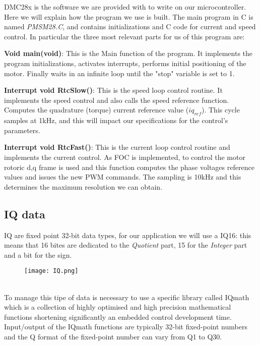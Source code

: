 \documentclass[12pt]{article}
\begin{document}
DMC28x is the software we are provided with to write on our microcontroller. Here we will explain how the program we use is built. 
The main program in C is named \textit{PMSM28.C}, and contains initializations and C code for current and speed control. 
In particular the three most relevant parts for us of this program are:

\textbf{Void main(void)}:
This is the Main function of the program. It implements the program initializations, activates interrupts, performs initial positioning of the motor. Finally waits in an infinite loop until the "stop" variable is set to 1.

\textbf{Interrupt void RtcSlow()}:
This is the speed loop control routine.
It implements the speed control and also calls the speed reference function. Computes the quadrature (torque)
current reference value ($iq_{ref}$).
This cycle samples at 1kHz, and this will impact our specifications for the control's parameters.

\textbf{Interrupt void RtcFast()}:
This is the current loop control routine and implements the current control. As FOC is implemented, to control the motor rotoric d,q frame is used and this function computes the phase voltages reference values and issues the new PWM commands. The sampling is 10kHz and this determines the maximum resolution we can obtain. 

\subsection{IQ data}

IQ are fixed point 32-bit data types, for our application we will use a IQ16: this means that 16 bites are dedicated to the \textit{Quotient} part, 15 for the \textit{Integer} part and a bit for the sign.
\begin{figure}[h]
\centering
\texttt{[image: IQ.png]}
\end{figure}\\  
To manage this tipe of data is necessary to use a specific library called IQmath which is a collection of highly
optimised and high precision mathematical functions shortening significantly an embedded control development time. 
Input/output of the IQmath functions are typically 32-bit fixed-point numbers and the Q format of
the fixed-point number can vary from Q1 to Q30.
\end{document}
